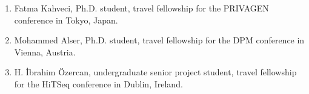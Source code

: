 
\begin{enumerate}
  \item
    Fatma Kahveci, Ph.D. student, travel fellowship for the PRIVAGEN conference in Tokyo, Japan.
  \item
    Mohammed Alser, Ph.D. student, travel fellowship for the DPM conference in Vienna, Austria.
  \item
    H. İbrahim Özercan, undergraduate senior project student, travel fellowship for the HiTSeq conference in Dublin, Ireland.
\end{enumerate}

